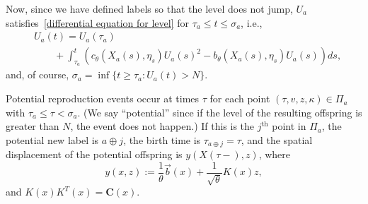 \documentclass[EJP]{ejpecp} %
\newcommand{\meanq}{\vec b}    %
\newcommand{\covq}{\mathbf{C}}     %
\newcommand{\concat}{\oplus}   %
\begin{document}
Now, since we have defined labels so that the level does not jump,
$U_a$ satisfies~\eqref{differential equation for level}
	for $\tau_a \le t \le \sigma_a$, i.e.,
\begin{equation} \label{eqn:U_line_of_descent}
    \begin{split}
& U_a(t)
    =
    U_a(\tau_a) \\
&\qquad {}   
    + \int_{\tau_a}^{t}
    \left(
        c_\theta(X_a(s),\eta_s) U_a(s)^2
        -
        b_\theta(X_a(s),\eta_s) U_a(s)
    \right)
    ds ,
\end{split}
\end{equation}
and, of course, $\sigma_a = \inf\{t \ge \tau_a : U_a(t) > N\}$.

Potential reproduction events occur at times $\tau$
for each point $(\tau, v, z, \kappa) \in \Pi_a$ with $\tau_a \le \tau < \sigma_a$.
(We say ``potential'' since if the level of the resulting offspring is greater than $N$,
the event does not happen.)
If this is the $j^\text{th}$ point in $\Pi_a$,
the potential new label is $a \concat j$, the birth time is $\tau_{a \concat j} = \tau$,
and the spatial displacement of the potential offspring is $y(X(\tau-), z)$, where
$$
    y(x, z)
    :=
    \frac{1}{\theta}\meanq(x)
    +
    \frac{1}{\sqrt{\theta}}K(x) z,
$$
and $K(x)K^{T}(x) = \covq(x)$.
\end{document}
